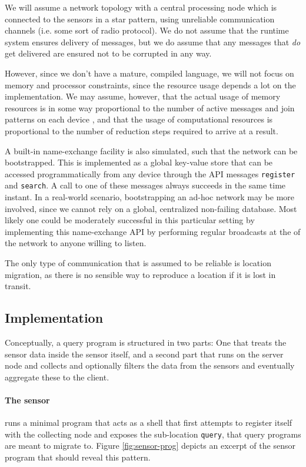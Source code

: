 We will assume a network topology with a central processing node which is
connected to the sensors in a star pattern, using unreliable communication
channels (i.e. some sort of radio protocol).  We do not assume that the runtime
system ensures delivery of messages, but we do assume that any messages that
\emph{do} get delivered are ensured not to be corrupted in any way.

However, since we don't have a mature, compiled language, we will not focus on
memory and processor constraints, since the resource usage depends a lot on the
implementation. We may assume, however, that the actual usage of memory
resources is in some way proportional to the number of active messages and join
patterns on each device , and that the usage of computational resources is
proportional to the number of reduction steps required to arrive at a result.

A built-in name-exchange facility is also simulated, such that the network can
be bootstrapped. This is implemented as a global key-value store that can be
accessed programmatically from any device through the API messages
\verb!register! and \verb!search!. A call to one of these messages always
succeeds in the same time instant. In a real-world scenario, bootstrapping an
ad-hoc network may be more involved, since we cannot rely on a global,
centralized non-failing database.  Most likely one could be moderately
successful in this particular setting by implementing this name-exchange API by
performing regular broadcasts at the 
of the network to anyone willing to listen.

The only type of communication that is assumed to be reliable is location
migration, as there is no sensible way to reproduce a location if it is lost
in transit.

\subsection*{Implementation}

Conceptually, a query program is structured in two parts: One that treats the
sensor data inside the sensor itself, and a second part that runs on the server
node and collects and optionally filters the data from the sensors and
eventually aggregate these to the client.

\paragraph{The sensor} runs a minimal program that acts as a shell that first
attempts to register itself with the collecting node and exposes the
sub-location \texttt{query}, that query programs are meant to migrate to.
Figure \ref{fig:sensor-prog} depicts an excerpt of the sensor program that
should reveal this pattern.

